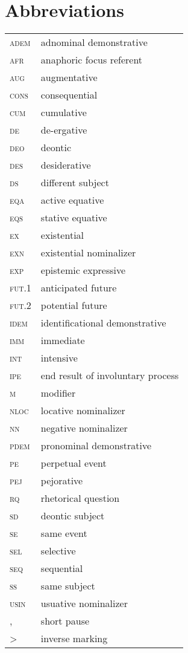 \documentclass[output=paper]{langsci/langscibook}
\begin{document}
\section*{Abbreviations}
\begin{tabularx}{.45\textwidth}{lQ}

\textsc{adem} & adnominal demonstrative\\ 
\textsc{afr} & anaphoric focus referent\\ 
\textsc{aug} & augmentative\\ 
\textsc{cons} & consequential\\ 
\textsc{cum} & cumulative\\
\textsc{de} & de-ergative\\ 
\textsc{deo} & deontic\\ 
\textsc{des} & desiderative\\ 
\textsc{ds} & different subject\\ 
\textsc{eqa} & active equative\\ 
\textsc{eqs} & stative equative\\  
\textsc{ex} & existential\\ 
\textsc{exn} & existential nominalizer\\ 
\textsc{exp} & epistemic expressive\\ 
\textsc{fut}.1 & anticipated future\\ 
\textsc{fut}.2 & potential future\\ 
\textsc{idem} & identificational demonstrative\\ 
\textsc{imm} & immediate\\ 
\textsc{int} & intensive\\ 
\textsc{ipe} & end result of involuntary process\\  
\textsc{m} & modifier\\   
\textsc{nloc} & locative nominalizer\\ 
\textsc{nn} & negative nominalizer\\ 
\textsc{pdem} & pronominal demonstrative\\ 
\textsc{pe} & perpetual event\\  
\textsc{pej} & pejorative \\ 
\textsc{rq} & rhetorical question\\ 
\textsc{sd} & deontic subject\\ 
\textsc{se} & same event\\ 
\textsc{sel} & selective\\ 
\textsc{seq} & sequential\\ 
\textsc{ss} & same subject\\ 
\textsc{usin} & usuative  nominalizer\\ 
, & short pause\\ 
> &inverse marking\\
\end{tabularx}
\end{document}
